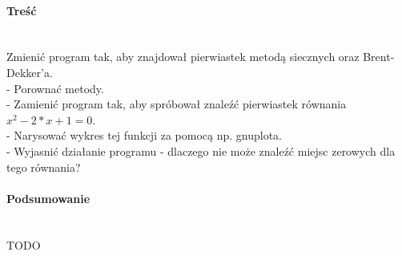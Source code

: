 \paragraph{Treść}~\\
Zmienić program tak, aby znajdował pierwiastek metodą siecznych oraz Brent-Dekker'a.\\
- Porownać metody.\\
- Zamienić program tak, aby spróbował znaleźć pierwiastek równania $ x^2 - 2*x + 1 = 0 $.\\
- Narysować wykres tej funkcji za pomocą np. gnuplota.\\
- Wyjasnić działanie programu - dlaczego nie może znaleźć miejsc zerowych dla tego równania?

\paragraph{Podsumowanie}~\\
TODO
